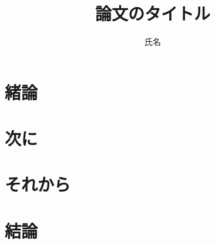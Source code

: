 \documentclass[a4j,10pt,twocolumn]{abstract}
\title{論文のタイトル}	%
\author{氏名} 		%
\begin{document}
\absttitle 		%

\section{緒論}

\section{次に}

\section{それから}

\section{結論}

%
%
\begin{thebibliography}{1}
\bibitem{}
\end{thebibliography}
\newpage
\pagebreak
\end{document}
